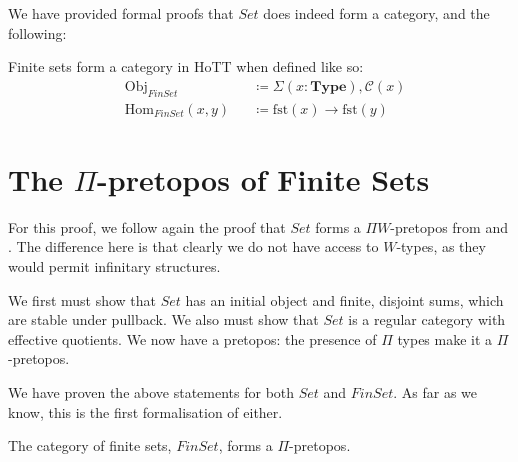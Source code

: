We have provided formal proofs that \(\mathit{Set}\) does indeed form a
category, and the following:
\begin{theorem}
  Finite sets form a category in HoTT when defined like so:
  \begin{equation}
    \begin{alignedat}{3}
      &\text{Obj}_\mathit{FinSet}      &&\coloneqq \Sigma(x : \mathbf{Type}) , \mathcal{C}(x) \\
      &\text{Hom}_\mathit{FinSet}(x , y) &&\coloneqq  \text{fst}(x) \rightarrow \text{fst}(y)
    \end{alignedat}
  \end{equation}
\end{theorem}
\section{The \(\Pi\)-pretopos of Finite Sets}
For this proof, we follow again the proof that \(\mathit{Set}\) forms a \(\Pi
W\)-pretopos from \cite[chapter 10]{hottbook} and
\cite{rijkeSetsHomotopyType2015}.
The difference here is that clearly we do not have access to \(W\)-types, as
they would permit infinitary structures.

We first must show that \(\mathit{Set}\) has an initial object and finite,
disjoint sums, which are stable under pullback.
We also must show that \(\mathit{Set}\) is a regular category with effective
quotients.
We now have a pretopos: the presence of \(\Pi\) types make it a
\(\Pi\)-pretopos.

We have proven the above statements for both \(\mathit{Set}\) and
\(\mathit{FinSet}\).
As far as we know, this is the first formalisation of either.
\begin{theorem} \label{finite-topos}
  The category of finite sets, \(\mathit{FinSet}\), forms a \(\Pi\)-pretopos.
\end{theorem}


